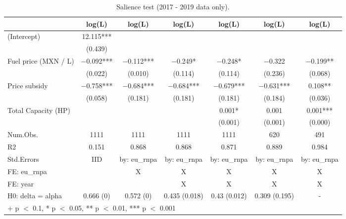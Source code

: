 \begin{table}

\caption{\label{tab:}Salience test (2017 - 2019 data only).}
\centering
\begin{tabular}[t]{lcccccc}
\toprule
  & log(L) & log(L)  & log(L)   & log(L)    & log(L)     & log(L)     \\
\midrule
(Intercept) & \num{12.115}*** &  &  &  &  & \\
 & (\num{0.439}) &  &  &  &  & \\
Fuel price (MXN / L) & \num{-0.092}*** & \num{-0.112}*** & \num{-0.249}* & \num{-0.248}* & \num{-0.322} & \num{-0.199}**\\
 & (\num{0.022}) & (\num{0.010}) & (\num{0.114}) & (\num{0.114}) & (\num{0.236}) & (\num{0.068})\\
Price subsidy & \num{-0.758}*** & \num{-0.684}*** & \num{-0.684}*** & \num{-0.679}*** & \num{-0.631}*** & \num{0.108}**\\
 & (\num{0.058}) & (\num{0.181}) & (\num{0.181}) & (\num{0.181}) & (\num{0.184}) & (\num{0.036})\\
Total Capacity (HP) &  &  &  & \num{0.001}* & \num{0.001} & \num{0.001}***\\
 &  &  &  & (\num{0.001}) & (\num{0.001}) & (\num{0.000})\\
\midrule
Num.Obs. & \num{1111} & \num{1111} & \num{1111} & \num{1111} & \num{620} & \num{491}\\
R2 & \num{0.151} & \num{0.868} & \num{0.868} & \num{0.871} & \num{0.889} & \num{0.984}\\
Std.Errors & IID & by: eu\_rnpa & by: eu\_rnpa & by: eu\_rnpa & by: eu\_rnpa & by: eu\_rnpa\\
FE: eu_rnpa &  & X & X & X & X & X\\
FE: year &  &  & X & X & X & X\\
H0: delta = alpha & 0.666 (0) & 0.572 (0) & 0.435 (0.018) & 0.43 (0.012) & 0.309 (0.195) & -\\
\bottomrule
\multicolumn{7}{l}{\rule{0pt}{1em}+ p $<$ 0.1, * p $<$ 0.05, ** p $<$ 0.01, *** p $<$ 0.001}\\
\end{tabular}
\end{table}
